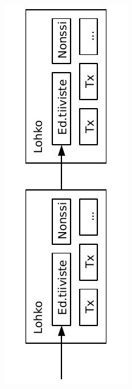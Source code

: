 \documentclass{article}
\begin{document}
\begin{figure}[H]
    \centering
    \includegraphics[angle=270,width=\textwidth]{figures/fig3.pdf}
\end{figure}
\end{document}
